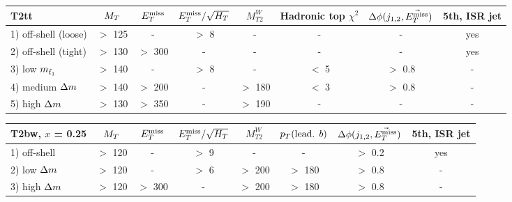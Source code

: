 \begin{table}[!ht]
{\footnotesize
\begin{center}
\hspace*{-0.8cm}
        \begin{tabular}{|l|ccccccc|}
            \hline
            \textbf{T2tt}          & $M_T$   & $E_T^\text{miss}$    & $E_T^\text{miss}/\sqrt{H_T}$  & $M_{T2}^W$ & Hadronic top $\chi^2$ & $\Delta\phi(j_{1,2},\vec{E_T^\text{miss}})$      &   5th, ISR jet \\
        \hline                                                                                                                                     
        1) off-shell (loose)       & $>$ 125 & -       &   $>$ 8            &     -     & -             &          - &    yes        \\
        2) off-shell (tight)       & $>$ 130 & $>$ 300 &   -                &     -     & -        	    &          - &    yes        \\
        3) low    $m_{\tilde{t}_1}$  & $>$ 140 & -       &   $>$ 8            &     -     &  $<$ 5        &  $>$ 0.8   &    -          \\
        4) medium $\Delta m$        & $>$ 140 & $>$ 200 &   -                &  $>$ 180  &  $<$ 3        &  $>$ 0.8   &    -          \\
        5) high   $\Delta m$        & $>$ 130 & $>$ 350 &   -                &  $>$ 190  & -             &          - &    -          \\
            \hline
        \end{tabular}
\hspace*{-0.5cm}
        \begin{tabular}{|l|ccccccc|}
            \hline
            \textbf{T2bw}, $x$ = 0.25        & $M_T$     & $E_T^\text{miss}$    & $E_T^\text{miss}/\sqrt{H_T}$ & $M_{T2}^W$ & $p_T(\text{lead. }b)$ & $\Delta\phi(j_{1,2},\vec{E_T^\text{miss}})$ & 5th, ISR jet  \\
        \hline                                                                                                                      
        1) off-shell       & $>$ 120   &  -       &    $>$  9       &     -      &   -                   &  $>$ 0.2      & yes           \\
        2) low    $\Delta m$ & $>$ 120   &  -       &    $>$  6       &  $>$ 200   & $>$ 180               &  $>$ 0.8      & -             \\
        3) high   $\Delta m$ & $>$ 120   & $>$ 300  &     -           &  $>$ 200   & $>$ 180               &  $>$ 0.8      & -             \\

\end{tabular}
\end{center}}
\end{table}
